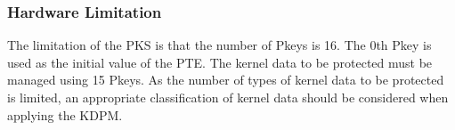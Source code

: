 \subsubsection{Hardware Limitation}
The limitation of the PKS is that the number of Pkeys is 16. The 0th
Pkey is used as the initial value of the PTE.
The kernel data to be protected must be managed using 15 Pkeys.
%
%
As the number of types of kernel data to be protected is limited, an appropriate
classification of kernel data should be considered when applying the KDPM.



